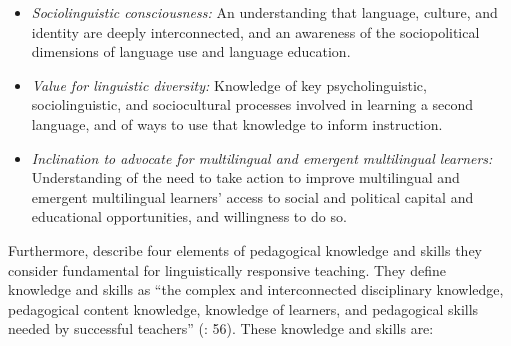 \documentclass[output=paper]{langscibook}
\begin{document}
\begin{itemize}
\item \textit{Sociolinguistic consciousness:} An understanding that language, culture, and identity are deeply interconnected, and an awareness of the sociopolitical dimensions of language use and language education. 
\item \textit{Value for linguistic diversity:} Knowledge of key psycholinguistic, sociolinguistic, and sociocultural processes involved in learning a second language, and of ways to use that knowledge to inform instruction.
\item \textit{Inclination to advocate for multilingual and emergent multilingual learners:} Understanding of the need to take action to improve multilingual and emergent multilingual learners’ access to social and political capital and educational opportunities, and willingness to do so. 
\end{itemize}

Furthermore, \citet[101--102]{LucasVillegas2013} describe four elements of pedagogical knowledge and skills they consider fundamental for linguistically responsive teaching. They define knowledge and skills as “the complex and interconnected disciplinary knowledge, pedagogical content knowledge, knowledge of learners, and pedagogical skills needed by successful teachers” (\citealt{LucasVillegas2011}: 56). These knowledge and skills are:
\end{document}
